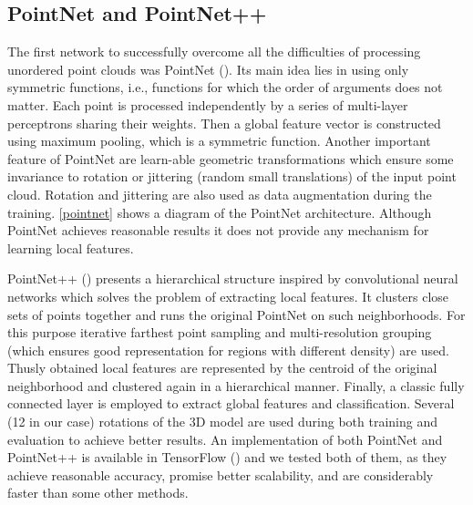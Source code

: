 \subsection{PointNet and PointNet++}
The first network to successfully overcome all the difficulties of processing unordered point clouds was PointNet (\cite{qi_pointnet:_2016}). Its main idea lies in using only symmetric functions, i.e., functions for which the order of arguments does not matter. Each point is processed independently by a series of multi-layer perceptrons sharing their weights. Then a global feature vector is constructed using maximum pooling, which is a symmetric function. Another important feature of PointNet are learn-able geometric transformations which ensure some invariance to rotation or jittering (random small translations) of the input point cloud. Rotation and jittering are also used as data augmentation during the training. \autoref{pointnet} shows a diagram of the PointNet architecture.
Although PointNet achieves reasonable results it does not provide any mechanism for learning local features.\par 
PointNet++ (\cite{qi_pointnet++:_2017}) presents a hierarchical structure inspired by convolutional neural networks which solves the problem of extracting local features. It clusters close sets of points together and runs the original PointNet on such neighborhoods. For this purpose iterative farthest point sampling and multi-resolution grouping (which ensures good representation for regions with different density) are used. Thusly obtained local features are represented by the centroid of the original neighborhood and clustered again in a hierarchical manner. Finally, a classic fully connected layer is employed to extract global features and classification.
Several (12 in our case) rotations of the 3D model are used during both training and evaluation to achieve better results. An implementation of both PointNet and PointNet++ is available in TensorFlow (\cite{qi_pointnet_2016, qi_pointnet++_2017}) and we tested both of them, as they achieve reasonable accuracy, promise better scalability, and are considerably faster than some other methods.



